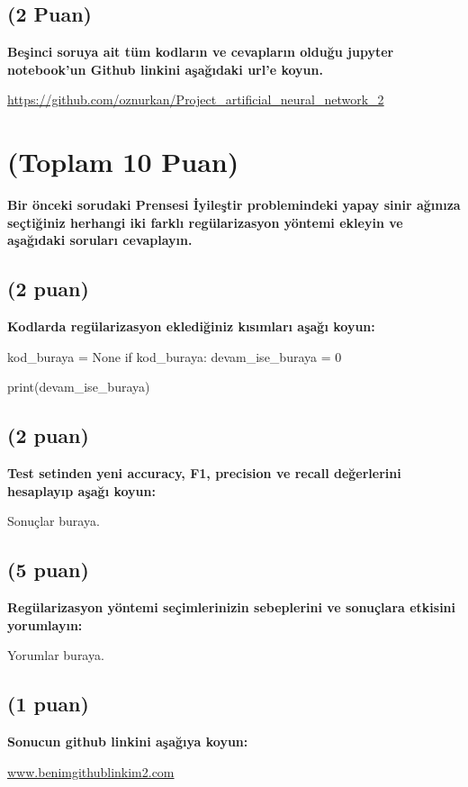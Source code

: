 \documentclass[11pt]{article}
\begin{document}
\subsection{(2 Puan)} \textbf{Beşinci soruya ait tüm kodların ve cevapların olduğu jupyter notebook'un Github linkini aşağıdaki url'e koyun.}

\url{https://github.com/oznurkan/Project_artificial_neural_network_2}

\section{(Toplam 10 Puan)} \textbf{Bir önceki sorudaki Prensesi İyileştir problemindeki yapay sinir ağınıza seçtiğiniz herhangi iki farklı regülarizasyon yöntemi ekleyin ve aşağıdaki soruları cevaplayın.} 

\subsection{(2 puan)} \textbf{Kodlarda regülarizasyon eklediğiniz kısımları aşağı koyun:} 

\begin{python}
kod_buraya = None
if kod_buraya:
    devam_ise_buraya = 0

print(devam_ise_buraya)
\end{python}

\subsection{(2 puan)} \textbf{Test setinden yeni accuracy, F1, precision ve recall değerlerini hesaplayıp aşağı koyun:}

Sonuçlar buraya.

\subsection{(5 puan)} \textbf{Regülarizasyon yöntemi seçimlerinizin sebeplerini ve sonuçlara etkisini yorumlayın:}

Yorumlar buraya.

\subsection{(1 puan)} \textbf{Sonucun github linkini  aşağıya koyun:}

\url{www.benimgithublinkim2.com}
\end{document}
